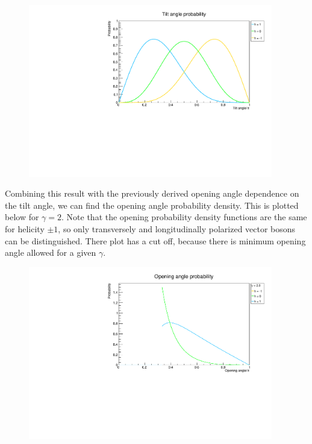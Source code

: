 \documentclass[12pt]{article}
\begin{document}
\vspace{-3mm}
\begin{figure}[H]
  \centering
  \includegraphics[width=0.95\textwidth]{fig/tilt_angle_prob.pdf}
\end{figure}

\vspace{-5mm}
Combining this result with the previously derived opening angle dependence on the tilt angle, we can find the opening angle probability density. This is plotted below for
$\gamma=2$. Note that the opening probability density functions are the same for helicity $\pm 1$, so only transversely and longitudinally polarized vector bosons can be distinguished. There plot has a cut off, because there is minimum opening angle allowed for a given $\gamma$.
\vspace{-3mm}
\begin{figure}[H]
  \centering
  \includegraphics[width=0.95\textwidth]{fig/opening_angle_prob.pdf}
  \vspace{-10mm}
\end{figure}
\end{document}
